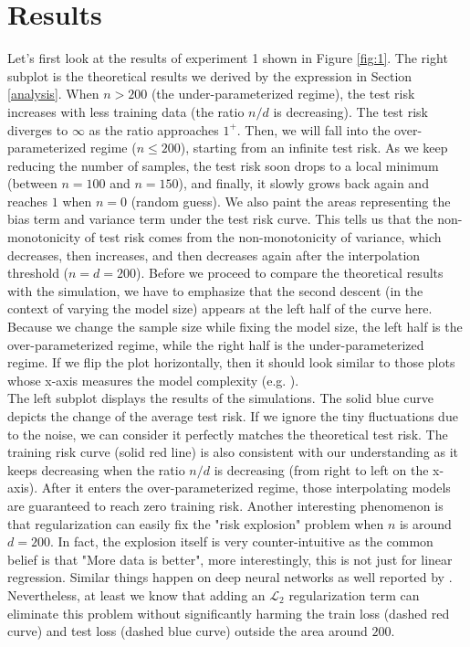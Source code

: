 \documentclass{article}
\begin{document}
\section{Results} \label{Results}
Let's first look at the results of experiment 1 shown in Figure \ref{fig:1}. The right subplot is the theoretical results we derived by the expression in Section \ref{analysis}. When $n > 200$ (the under-parameterized regime), the test risk increases with less training data (the ratio $n/d$ is decreasing). The test risk diverges to $\infty$ as the ratio approaches $1^+$. Then, we will fall into the over-parameterized regime ($n \leq 200$), starting from an infinite test risk. As we keep reducing the number of samples, the test risk soon drops to a local minimum (between $n=100$ and $n=150$), and finally, it slowly grows back again and reaches $1$ when $n = 0$ (random guess). We also paint the areas representing the bias term and variance term under the test risk curve. This tells us that the non-monotonicity of test risk comes from the non-monotonicity of variance, which decreases, then increases, and then decreases again after the interpolation threshold ($n = d = 200$). Before we proceed to compare the theoretical results with the simulation, we have to emphasize that the second descent (in the context of varying the model size) appears at the left half of the curve here. Because we change the sample size while fixing the model size, the left half is the over-parameterized regime, while the right half is the under-parameterized regime. If we flip the plot horizontally, then it should look similar to those plots whose x-axis measures the model complexity (e.g. \cite{belkin2019reconciling}).\\

\vspace{-3mm}
The left subplot displays the results of the simulations. The solid blue curve depicts the change of the average test risk. If we ignore the tiny fluctuations due to the noise, we can consider it perfectly matches the theoretical test risk. The training risk curve (solid red line) is also consistent with our understanding as it keeps decreasing when the ratio $n/d$ is decreasing (from right to left on the x-axis). After it enters the over-parameterized regime, those interpolating models are guaranteed to reach zero training risk. Another interesting phenomenon is that regularization can easily fix the "risk explosion" problem when $n$ is around $d = 200$. In fact, the explosion itself is very counter-intuitive as the common belief is that "More data is better", more interestingly, this is not just for linear regression. Similar things happen on deep neural networks as well reported by \cite{nakkiran2021deep}. Nevertheless, at least we know that adding an $\mathcal{L}_2$ regularization term can eliminate this problem without significantly harming the train loss (dashed red curve) and test loss (dashed blue curve) outside the area around $200$.
\end{document}
